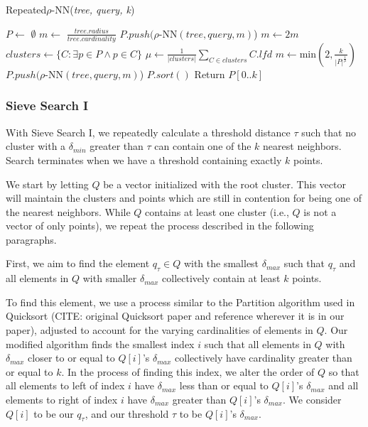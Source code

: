 \begin{algorithm} %
    \caption{Repeated$\rho$-NN(\emph{tree, query, k})} %
    \label{alg:knn-by-rnn} %
    \begin{algorithmic}[4] %
        \STATE $P \leftarrow$ $\emptyset$
        \STATE $m \leftarrow$ $\frac{tree.radius}{tree.cardinality}$
            \STATE $P.push(\rho$-NN$(tree, query, m)$)
            \STATE $m \leftarrow 2m$
        \ENDWHILE
            \STATE $clusters \leftarrow \{ C: \exists p \in P \land p \in C \}$
            \STATE $\mu \leftarrow \frac{1}{|clusters|} \sum_{C \in clusters} C.lfd$
            \STATE $m \leftarrow \text{min}\left(2, \frac{k}{|P|^{\frac{1}{\mu}}}\right)$
            \STATE $P.push(\rho$-NN$(tree, query, m)$)
        \ENDWHILE
        \STATE $P.sort()$
        \STATE Return $P[0..k]$
    \end{algorithmic}
    \end{algorithm}

\subsubsection{Sieve Search I}
\label{subsubsec:methods:knn-search:sieve}
With Sieve Search I, we repeatedly calculate a threshold distance $\tau$ such that no cluster with a $\delta_{min}$ greater than $\tau$ 
can contain one of the $k$ nearest neighbors. Search terminates when we have a threshold containing exactly $k$ points.

We start by letting $Q$ be a vector initialized with the root cluster. This vector will maintain the 
clusters and points which are still in contention for being one of the nearest neighbors.
While $Q$ contains at least one cluster (i.e., $Q$ is not a vector of only points), we repeat the process described in 
the following paragraphs. 

First, 
we aim to find the element $q_{\tau} \in Q$ with the smallest $\delta_{max}$ such that 
$q_{\tau}$ and all elements in $Q$ with smaller $\delta_{max}$ collectively contain at least $k$ points. 

To find this element, 
we use a process similar to the Partition algorithm used in Quicksort (CITE: original Quicksort paper and reference wherever it is 
in our paper), adjusted to account for the varying cardinalities of elements in $Q$. Our modified algorithm finds the smallest index $i$ such 
that all elements in $Q$ with $\delta_{max}$ closer to or equal to $Q[i]$'s $\delta_{max}$ collectively have cardinality greater
than or equal to $k$. In the process of finding this index, we alter the order of $Q$ so that all elements to left
of index $i$ have $\delta_{max}$ less than or equal to $Q[i]$'s $\delta_{max}$ and all elements to right of index $i$
have $\delta_{max}$ greater than $Q[i]$'s $\delta_{max}$. We consider $Q[i]$ to be our $q_{\tau}$, and our threshold 
$\tau$ to be $Q[i]$'s $\delta_{max}$.

